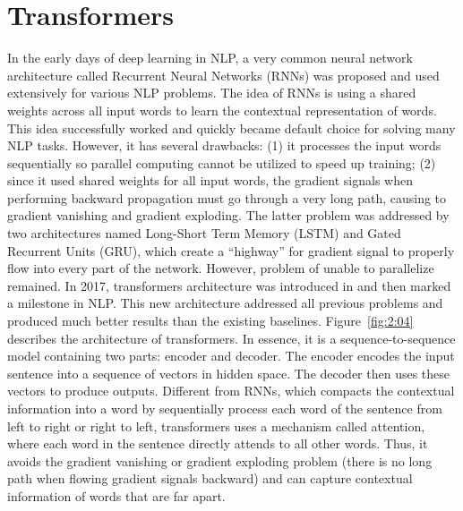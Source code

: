 \documentclass[12pt, sort&compress]{report}
\begin{document}
\section{Transformers}
\label{2.3}
In the early days of deep learning in NLP, a very common neural network architecture called Recurrent Neural Networks (RNNs) was proposed and used extensively for various NLP problems. The idea of RNNs is using a shared weights across all input words to learn the contextual representation of words. This idea successfully worked and quickly became default choice for solving many NLP tasks. However, it has several drawbacks: (1) it processes the input words sequentially so parallel computing cannot be utilized to speed up training; (2) since it used shared weights for all input words, the gradient signals when performing backward propagation must go through a very long path, causing to gradient vanishing and gradient exploding. The latter problem was addressed by two architectures named Long-Short Term Memory (LSTM) and Gated Recurrent Units (GRU), which create a “highway” for gradient signal to properly flow into every part of the network. However, problem of unable to parallelize remained. In 2017, transformers architecture was introduced in \cite{vaswani2017attention} and then marked a milestone in NLP. This new architecture addressed all previous problems and produced much better results than the existing baselines. Figure~\ref{fig:2:04} describes the architecture of transformers. In essence, it is a sequence-to-sequence model containing two parts: encoder and decoder. The encoder encodes the input sentence into a sequence of vectors in hidden space. The decoder then uses these vectors to produce outputs. Different from RNNs, which compacts the contextual information into a word by sequentially process each word of the sentence from left to right or right to left, transformers uses a mechanism called attention, where each word in the sentence directly attends to all other words. Thus, it avoids the gradient vanishing or gradient exploding problem (there is no long path when flowing gradient signals backward) and can capture contextual information of words that are far apart.
\end{document}
